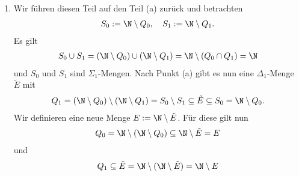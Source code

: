 \begin{solution}
\begin{enumerate}[label = \alph*.]
		\item Wir führen diesen Teil auf den Teil (a) zurück und betrachten
		\begin{align*}
			S_0 := \N \setminus Q_0, \quad S_1 := \N \setminus Q_1.
		\end{align*}
		Es gilt 
		\begin{align*}
			S_0 \cup S_1 = (\N \setminus Q_0) \cup (\N \setminus Q_1) = \N \setminus (Q_0 \cap Q_1) = \N
		\end{align*}
		und $S_0$ und $S_1$ sind $\Sigma_1$-Mengen. Nach Punkt (a) gibt es nun eine $\Delta_1$-Menge $\tilde{E}$ mit
		\begin{align*}
			Q_1 = (\N \setminus Q_0) \setminus (\N \setminus Q_1) = S_0 \setminus S_1 \subseteq \tilde{E} \subseteq S_0 = \N \setminus Q_0.
		\end{align*} 
		Wir definieren eine neue Menge $E := \N \setminus \tilde{E}$. Für diese gilt nun
		\begin{align*}
			Q_0 = \N \setminus (\N \setminus Q_0) \subseteq \N \setminus \tilde{E} = E 
		\end{align*}
		und 
		\begin{align*}
			Q_1 \subseteq \tilde{E} = \N \setminus (\N \setminus \tilde{E}) = \N \setminus E
		\end{align*}
	\end{enumerate}

\end{solution}
